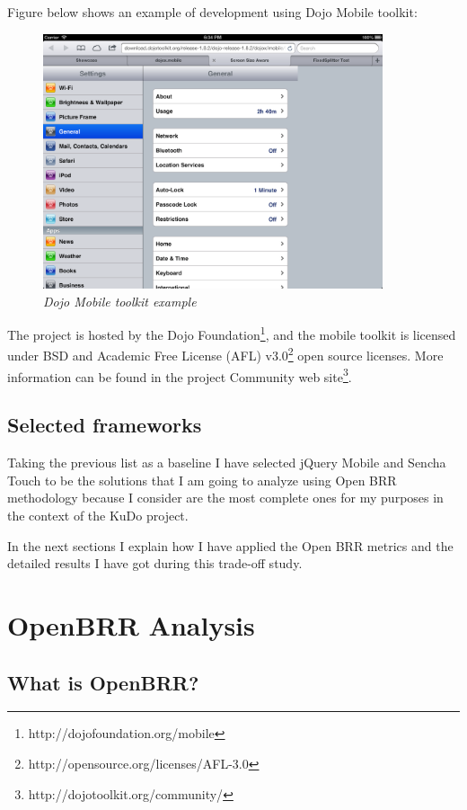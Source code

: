 \documentclass[a4paper,12pt]{book}
\begin{document}
Figure below shows an example of development using Dojo Mobile toolkit:

\begin{figure}[H]
    \centering
    \includegraphics[width=10cm, keepaspectratio]{img/dojo.png}
    \caption{\textit{Dojo Mobile toolkit example}}
 \end{figure}

The project is hosted by the Dojo Foundation\footnote{http://dojofoundation.org/mobile}, and the mobile toolkit is licensed under BSD and Academic Free License (AFL) v3.0\footnote{http://opensource.org/licenses/AFL-3.0} open source licenses. More information can be found in the project Community web site\footnote{http://dojotoolkit.org/community/}.

\section{Selected frameworks}
\label{sec:selected}
Taking the previous list as a baseline I have selected jQuery Mobile and Sencha Touch to be the solutions that I am going to analyze using Open BRR methodology because I consider are the most complete ones for my purposes in the context of the KuDo project.

In the next sections I explain how I have applied the Open BRR metrics and the detailed results I have got during this trade-off study.


\chapter{OpenBRR Analysis}
\label{chap:openbrr}

\section{What is OpenBRR?}
\label{sec:openbrr2}
\end{document}
